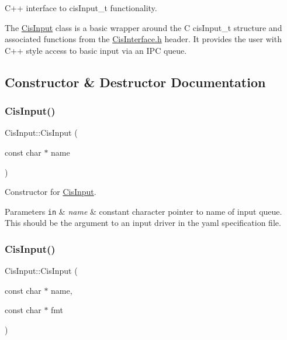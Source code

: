 C++ interface to cis\+Input\+\_\+t functionality.

The \mbox{\hyperlink{classCisInput}{Cis\+Input}} class is a basic wrapper around the C cis\+Input\+\_\+t structure and associated functions from the \mbox{\hyperlink{CisInterface_8h_source}{Cis\+Interface.\+h}} header. It provides the user with C++ style access to basic input via an I\+PC queue. 

\subsection{Constructor \& Destructor Documentation}
\mbox{\label{classCisInput_a5a81811ecb4ea9b3d786ea60522cdcb7}} 
\subsubsection{\texorpdfstring{Cis\+Input()}{CisInput()}\hspace{0.1cm}{\footnotesize\ttfamily [1/2]}}
{\footnotesize\ttfamily Cis\+Input\+::\+Cis\+Input (\begin{DoxyParamCaption}\item[{const char $\ast$}]{name }\end{DoxyParamCaption})\hspace{0.3cm}{\ttfamily [inline]}}



Constructor for \mbox{\hyperlink{classCisInput}{Cis\+Input}}. 


\begin{DoxyParams}[1]{Parameters}
\mbox{\tt in}  & {\em name} & constant character pointer to name of input queue. This should be the argument to an input driver in the yaml specification file. \\
\hline
\end{DoxyParams}
\mbox{\label{classCisInput_ad39b94867de8741606bef7f1acdcbfd2}} 
\subsubsection{\texorpdfstring{Cis\+Input()}{CisInput()}\hspace{0.1cm}{\footnotesize\ttfamily [2/2]}}
{\footnotesize\ttfamily Cis\+Input\+::\+Cis\+Input (\begin{DoxyParamCaption}\item[{const char $\ast$}]{name,  }\item[{const char $\ast$}]{fmt }\end{DoxyParamCaption})\hspace{0.3cm}{\ttfamily [inline]}}



